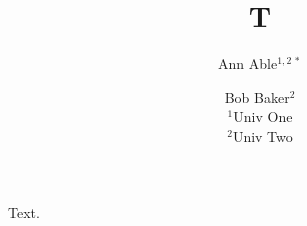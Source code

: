 \documentclass{article}
\title{T}
\author{Ann Able$^{1,2\,*}$ \and Bob Baker$^{2}$\\ $^1$Univ One \\ $^2$Univ Two}
\begin{document}
\maketitle
Text.
\end{document}
